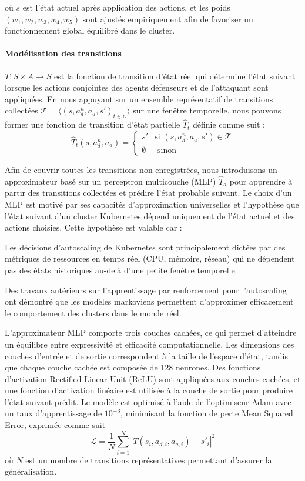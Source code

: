 où $s$ est l'état actuel après application des actions, et les poids $(w_1, w_2, w_3, w_4, w_5)$ sont ajustés empiriquement afin de favoriser un fonctionnement global équilibré dans le cluster.


\noindent \paragraph{\textbf{Modélisation des transitions}} $T: S \times A \rightarrow S$ est la fonction de transition d'état réel qui détermine l'état suivant lorsque les actions conjointes des agents défenseurs et de l'attaquant sont appliquées. En nous appuyant sur un ensemble représentatif de transitions collectées $\mathcal{T} = \langle(s, a_d^n, a_a, s')_{t\in \mathbb{N}}\rangle$ sur une fenêtre temporelle, nous pouvons former une fonction de transition d'état partielle $\hat{T}_t$ définie comme suit :
%
$$
\hat{T}_t(s, a_d^n, a_a) =
\begin{cases} 
    s' & \text{si } (s, a_d^n, a_a, s') \in \mathcal{T} \\
    \emptyset & \text{ sinon}
\end{cases}
$$

Afin de couvrir toutes les transitions non enregistrées, nous introduisons un approximateur basé sur un perceptron multicouche (MLP) $\hat{T}_a$ pour apprendre à partir des transitions collectées et prédire l'état probable suivant. Le choix d'un MLP est motivé par ses capacités d'approximation universelles et l'hypothèse que l'état suivant d'un cluster Kubernetes dépend uniquement de l'état actuel et des actions choisies. Cette hypothèse est valable car :
\begin{enumerate*}[label={\roman*)}, itemjoin={;\quad }]
    \item Les décisions d'autoscaling de Kubernetes sont principalement dictées par des métriques de ressources en temps réel (CPU, mémoire, réseau) qui ne dépendent pas des états historiques au-delà d'une petite fenêtre temporelle
    \item Des travaux antérieurs sur l'apprentissage par renforcement pour l'autoscaling~\cite{Gari2021} ont démontré que les modèles markoviens permettent d'approximer efficacement le comportement des clusters dans le monde réel.
\end{enumerate*}
L'approximateur MLP comporte trois couches cachées, ce qui permet d'atteindre un équilibre entre expressivité et efficacité computationnelle. Les dimensions des couches d'entrée et de sortie correspondent à la taille de l'espace d'état, tandis que chaque couche cachée est composée de 128 neurones. Des fonctions d'activation Rectified Linear Unit (ReLU) sont appliquées aux couches cachées, et une fonction d'activation linéaire est utilisée à la couche de sortie pour produire l'état suivant prédit. Le modèle est optimisé à l'aide de l'optimiseur Adam avec un taux d'apprentissage de $10^{-3}$, minimisant la fonction de perte Mean Squared Error, exprimée comme suit
$$
\mathcal{L} = \frac{1}{N} \sum_{i=1}^N |T(s_i, a_{d,i}, a_{a,i}) - s'_i|^2
$$
où $N$ est un nombre de transitions représentatives permettant d'assurer la généralisation.

